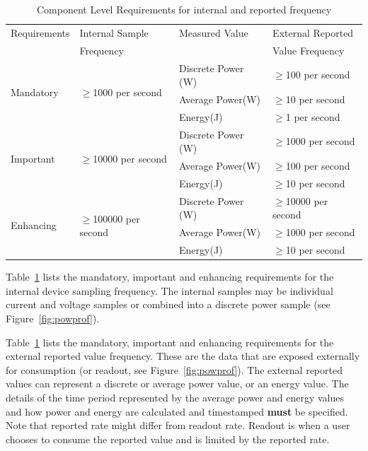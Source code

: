 \begin{table}[htbp]
\caption{Component Level Requirements for internal and reported frequency}
\label{tab:comlevel}
\centering
\begin{tabular}{ |l|l|l|l| }
\hline
Requirements & Internal Sample & Measured Value & External Reported \\
 & Frequency & & Value Frequency \\
\hline

\multirow{3}{*}{Mandatory} & \multirow{3}{*}{\mbox{$ \ge $}1000 per second} &
Discrete Power (W) & \mbox{$ \ge $}100 per second \\  
 & & Average Power(W) & \mbox{$ \ge $}10 per second \\  
 & & Energy(J) & \mbox{$ \ge $}1 per second \\  \hline

\multirow{3}{*}{Important} & \multirow{3}{*}{\mbox{$ \ge $}10000 per second} &   
Discrete Power (W) & \mbox{$ \ge $}1000 per second \\  
 & & Average Power(W) & \mbox{$ \ge $}100 per second \\  
 & & Energy(J) & \mbox{$ \ge $}10 per second \\  \hline

\multirow{3}{*}{Enhancing} & \multirow{3}{*}{\mbox{$ \ge $}100000 per second} & 
Discrete Power (W) & \mbox{$ \ge $}10000 per second \\  
 & & Average Power(W) & \mbox{$ \ge $}1000 per second \\  
 & & Energy(J) & \mbox{$ \ge $}10 per second \\  \hline

\end{tabular}
\end{table}

Table~\ref{tab:comlevel} lists the mandatory, important and enhancing requirements for 
the internal device sampling frequency. The internal samples may be individual current 
and voltage samples or combined into a discrete power sample (see Figure~\ref{fig:powprof}).

Table~\ref{tab:comlevel} lists the mandatory, important and enhancing requirements for the external 
reported value frequency. These are the data that are exposed externally for consumption 
(or readout, see Figure~\ref{fig:powprof}). The external reported values can represent a discrete or 
average power value, or an energy value. The details of the time period represented by the 
average power and energy values and how power and energy are calculated and timestamped \textbf{must} 
be specified. Note that reported rate might differ from readout rate. Readout is when a 
user chooses to consume the reported value and is limited by the reported rate.


